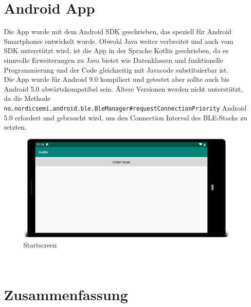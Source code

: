 \section{Android App}
Die App wurde mit dem Android SDK geschrieben, das speziell für Android Smartphones entwickelt wurde.
Obwohl Java weiter verbreitet und auch vom SDK unterstützt wird, ist die App in der Sprache Kotlin geschrieben, da es sinnvolle Erweiterungen zu Java bietet wie Datenklassen und funktionelle Programmierung und der Code gleichzeitig mit Javacode substituierbar ist.\\
Die App wurde für Android 9.0 kompiliert und getestet aber sollte auch bis Android 5.0 abwärtskompatibel sein.
Ältere Versionen werden nicht unterstützt, da die Methode \texttt{no.\allowbreak{}nordicsemi.\allowbreak{}android.\allowbreak{}ble.\allowbreak{}BleManager\#\allowbreak{}requestConnectionPriority} Android 5.0 erfordert und gebraucht wird, um den Connection Interval des BLE-Stacks zu setzten.\\
\begin{figure}[h]
	\centering
	\includegraphics[width=1.0\linewidth]{res/screen1.jpg}
	\caption{Startscreen}
	\label{fig:screen1}
\end{figure}\\

\section{Zusammenfassung}
